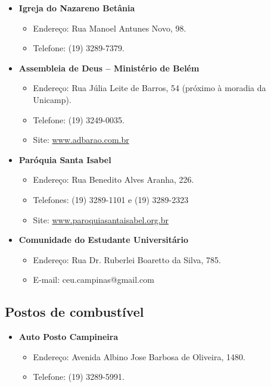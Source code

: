 \begin{itemize}
\item  \textbf{Igreja do Nazareno Betânia}
\begin{itemize}
\item  Endereço: Rua Manoel Antunes Novo, 98.
\item  Telefone: (19) 3289-7379.
\end{itemize}
\end{itemize}

\begin{itemize}
\item  \textbf{Assembleia de Deus -- Ministério de Belém}
\begin{itemize}
\item  Endereço: Rua Júlia Leite de Barros, 54 (próximo à moradia da Unicamp).
\item  Telefone: (19) 3249-0035.
\item  Site: \url{www.adbarao.com.br}
\end{itemize}
\end{itemize}

\begin{itemize}
\item  \textbf{Paróquia Santa Isabel}
\begin{itemize}
\item  Endereço: Rua Benedito Alves Aranha, 226.
\item  Telefones: (19) 3289-1101 e (19) 3289-2323
\item  Site: \url{www.paroquiasantaisabel.org.br}
\end{itemize}
\end{itemize}

\begin{itemize}
\item  \textbf{Comunidade do Estudante Universitário}
\begin{itemize}
\item  Endereço: Rua Dr. Ruberlei Boaretto da Silva, 785.
\item  E-mail: ceu.campinas@gmail.com
\end{itemize}
\end{itemize}

\subsection{Postos de combustível}

\begin{itemize}
\item  \textbf{Auto Posto Campineira}
\begin{itemize}
\item  Endereço: Avenida Albino Jose Barbosa de Oliveira, 1480.
\item  Telefone: (19) 3289-5991.
\end{itemize}
\end{itemize}

